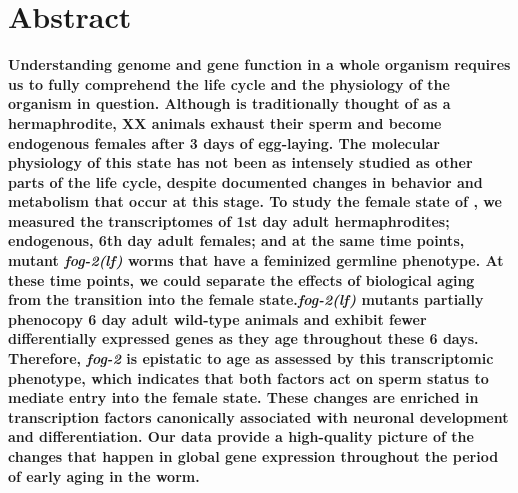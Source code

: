 \newcommand{\fog}{\emph{\mbox{fog-2(lf)}}}

\newcommand{\fogn}{1,881}
\newcommand{\agen}{5,592}
\newcommand{\interactionn}{1,318}
\newcommand{\coexpressed}{905}
\newcommand{\intersectn}{1,040}
\newcommand{\femalen}{405}

\newcommand{\tfaging}{145}
\newcommand{\tffog}{60}
\newcommand{\tfinteraction}{36}

\newcommand{\goldn}{1,056}
\newcommand{\goldfound}{506}
\newcommand{\goldpval}{$<10^{-38}$}

\newcommand{\website}{
            \url{https://wormlabcaltech.github.io/Angeles_Leighton_2016/}
            }
\newcommand{\webref}{
\href{https://wormlabcaltech.github.io/Angeles_Leighton_2016/}{website}}


\section*{Abstract}
\textbf{
  Understanding genome and gene function in a whole organism requires us to
  fully comprehend the life cycle and the physiology of the organism in question.
  Although \cel{} is traditionally thought of as a hermaphrodite, XX animals exhaust
  their sperm and become endogenous females after 3 days of egg-laying.
  The molecular physiology of this state has not been as intensely studied as other
  parts of the life cycle, despite documented changes in behavior and metabolism
  that occur at this stage. To study the female state of \cel{}, we measured the
  transcriptomes of 1st day adult hermaphrodites; endogenous, 6th day adult females;
  and at the same time points, mutant \fog{} worms that have a feminized germline
  phenotype. At these time points, we could separate the effects of biological
  aging from the transition into the female state.\@ \fog{} mutants partially phenocopy
  6 day adult wild-type animals and exhibit fewer differentially expressed genes as
  they age throughout these 6 days. Therefore, \emph{fog-2} is epistatic to age as
  assessed by this transcriptomic phenotype, which indicates that both factors act
  on sperm status to mediate entry into the female state. These changes are enriched
  in transcription factors canonically associated with neuronal development and
  differentiation. Our data provide a high-quality picture of the changes that
  happen in global gene expression throughout the period of early aging in the
  worm.}
\vspace{10mm}



